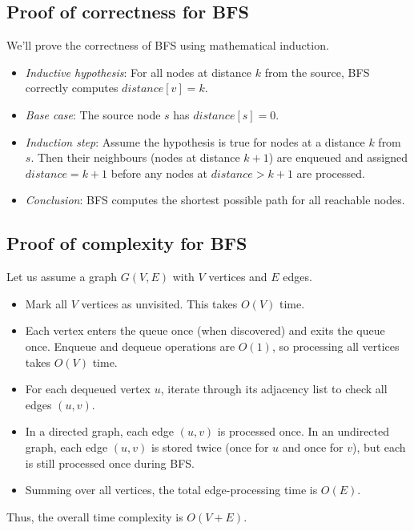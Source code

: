 \cleardoublepage
{}
\begin{appendices}
	\chapter{}
	\section{Proof of correctness for BFS}\label{appendix:bfs:correctness}
		We'll prove the correctness of BFS using mathematical induction.
		\begin{itemize}
			\item \textit{Inductive hypothesis}: For all nodes at distance
			$k$ from the source, BFS correctly computes $distance[v] = k$.
			\item \textit{Base case}: The source node $s$ has $distance[s] = 0$.
			\item \textit{Induction step}: Assume the hypothesis is true for nodes at a distance $k$ from $s$. Then their neighbours (nodes at distance $k + 1$) are enqueued and assigned $distance = k + 1$ before any nodes at $distance > k + 1$ are processed.
			\item \textit{Conclusion}: BFS computes the shortest possible path for all reachable nodes.
		\end{itemize}
	\section{Proof of complexity for BFS}\label{appendix:bfs:complexity}
		Let us assume a graph $G(V, E)$ with $V$ vertices and $E$ edges.
	\begin{itemize}
		\item Mark all $V$ vertices as unvisited. This takes $O(V)$ time.
		\item Each vertex enters the queue once (when discovered) and exits the queue once. Enqueue and dequeue operations are $O(1)$, so processing all vertices takes $O(V)$ time.
		\item For each dequeued vertex $u$, iterate through its adjacency list to check all edges $(u,v)$.
		\item In a directed graph, each edge $(u,v)$ is processed once. In an undirected graph, each edge $(u,v)$ is stored twice (once for $u$ and once for $v$), but each is still processed once during BFS.
		\item Summing over all vertices, the total edge-processing time is $O(E)$.
	\end{itemize}
		Thus, the overall time complexity is $O(V+E)$.

\end{appendices}
